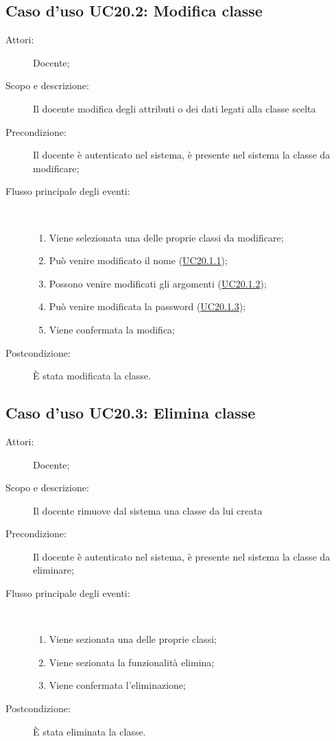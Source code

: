 \subsection{Caso d'uso UC20.2: Modifica classe}\begin{description}
\item[Attori:] Docente;
\item[Scopo e descrizione:] Il docente modifica degli attributi o dei dati legati alla classe scelta
      \item[Precondizione:] Il docente è autenticato nel sistema, è presente nel sistema la classe da modificare;

        \item[Flusso principale degli eventi:] \ 
 \begin{enumerate}
          \item Viene selezionata una delle proprie classi da modificare;
          \item Può venire modificato il nome (\hyperlink{UC20.1.1}{UC20.1.1});
          \item Possono venire modificati gli argomenti (\hyperlink{UC20.1.2}{UC20.1.2});
          \item Può venire modificata la password (\hyperlink{UC20.1.3}{UC20.1.3});
          \item Viene confermata la modifica;

      \end{enumerate}
    \item[Postcondizione:] È stata modificata la classe.
  \end{description}
\hypertarget{UC20.3}{}
\subsection{Caso d'uso UC20.3: Elimina classe}\begin{description}
\item[Attori:] Docente;
\item[Scopo e descrizione:] Il docente rimuove dal sistema una classe da lui creata 
      \item[Precondizione:] Il docente è autenticato nel sistema, è presente nel sistema la classe da eliminare;

        \item[Flusso principale degli eventi:] \ 
 \begin{enumerate}
          \item Viene sezionata una delle proprie classi;
          \item Viene sezionata la funzionalità elimina;
          \item Viene confermata l'eliminazione;

      \end{enumerate}
    \item[Postcondizione:] È stata eliminata la classe.
  \end{description}
\hypertarget{UC20.4}{}
